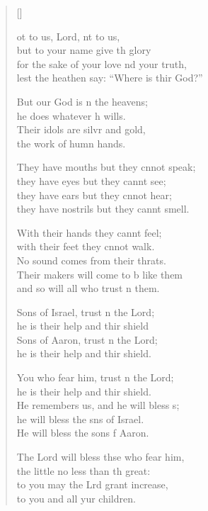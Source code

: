 \settowidth{\versewidth}{for the sake of your love and your truth, *}
\begin{verse}[\versewidth]
  \begin{patverse}
ot to us, Lord, nt to us,\Med\\
but to your name give th glory\\
for the sake of your love nd your truth,\Med\\
lest the heathen say: “Where is thir God?”

But our God is \pointup{\i}n the heavens;\Med\\
he does whatever h wills.\\
Their idols are silvr and gold,\Med\\
the work of humn hands.

They have mouths but they cnnot speak;\Med\\
they have eyes but they cannt see;\\
they have ears but they cnnot hear;\Med\\
they have nostrils but they cannt smell.

With their hands they cannt feel;\Flex\\
with their feet they cnnot walk.\Med\\
No sound comes from their thrats.\\
Their makers will come to b like them\Med\\
and so will all who trust \pointup{\i}n them.

Sons of Israel, trust \pointup{\i}n the Lord;\Med\\
he is their help and thir shield\\
Sons of Aaron, trust \pointup{\i}n the Lord;\Med\\
he is their help and thir shield.

You who fear him, trust \pointup{\i}n the Lord;\Med\\
he is their help and thir shield.\\
He remembers us, and he will bless s;\Flex\\
he will bless the sns of Israel.\Med\\
He will bless the sons f Aaron.

The Lord will bless thse who fear him,\Med\\
the little no less than th great:\\
to you may the Lrd grant increase,\Med\\
to you and all yur children.


\end{patverse}
\end{verse}
